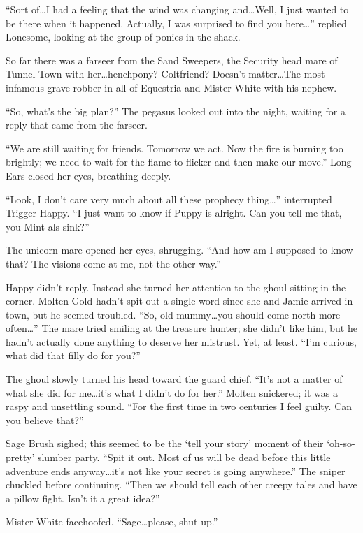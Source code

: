 ``Sort of\dots I had a feeling that the wind was changing and\dots Well, I just wanted to be there when it happened. Actually, I was surprised to find you here\dots'' replied Lonesome, looking at the group of ponies in the shack.

So far there was a farseer from the Sand Sweepers, the Security head mare of Tunnel Town with her\dots henchpony? Coltfriend? Doesn't matter\dots The most infamous grave robber in all of Equestria and Mister White with his nephew.

``So, what's the big plan?'' The pegasus looked out into the night, waiting for a reply that came from the farseer.

``We are still waiting for friends. Tomorrow we act. Now the fire is burning too brightly; we need to wait for the flame to flicker and then make our move.'' Long Ears closed her eyes, breathing deeply.

``Look, I don't care very much about all these prophecy thing\dots'' interrupted Trigger Happy. ``I just want to know if Puppy is alright. Can you tell me that, you Mint-als sink?''

The unicorn mare opened her eyes, shrugging. ``And how am I supposed to know that? The visions come at me, not the other way.''

Happy didn't reply. Instead she turned her attention to the ghoul sitting in the corner. Molten Gold hadn't spit out a single word since she and Jamie arrived in town, but he seemed troubled. ``So, old mummy\dots you should come north more often\dots'' The mare tried smiling at the treasure hunter; she didn't like him, but he hadn't actually done anything to deserve her mistrust. Yet, at least. ``I'm curious, what did that filly do for you?''

The ghoul slowly turned his head toward the guard chief. ``It's not a matter of what she did for me\dots it's what I didn't do for her.'' Molten snickered; it was a raspy and unsettling sound. ``For the first time in two centuries I feel guilty. Can you believe that?''

Sage Brush sighed; this seemed to be the `tell your story' moment of their `oh-so-pretty' slumber party. ``Spit it out. Most of us will be dead before this little adventure ends anyway\dots it's not like your secret is going anywhere.'' The sniper chuckled before continuing. ``Then we should tell each other creepy tales and have a pillow fight. Isn't it a great idea?''

Mister White facehoofed. ``Sage\dots please, shut up.''

